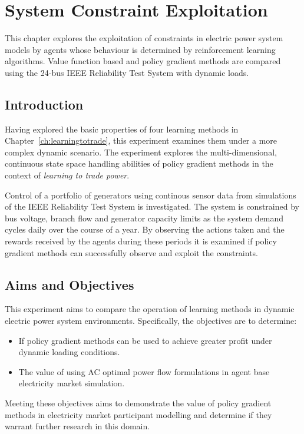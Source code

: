 \chapter{System Constraint Exploitation}
\label{ch:exploitation}
This chapter explores the exploitation of constraints in electric power
system models by agents whose behaviour is determined by reinforcement learning
algorithms.  Value function based and policy gradient methods are compared
using the 24-bus IEEE Reliability Test System with dynamic loads.

\section{Introduction}
Having explored the basic properties of four learning methods in
Chapter~\ref{ch:learningtotrade}, this experiment examines them under a
more complex dynamic scenario.  The experiment explores the multi-dimensional,
continuous state space handling abilities of policy gradient methods in the
context of \textit{learning to trade power}.

Control of a portfolio of generators using continous sensor data from
simulations of the IEEE Reliability Test System \cite{ieee79rts} is
investigated.  The system is constrained by bus voltage, branch flow and generator capacity
limits as the system demand cycles daily over the course of a year. By
observing the actions taken and the rewards received by the agents during these
periods it is examined if policy gradient methods can successfully observe and
exploit the constraints.

\section{Aims and Objectives}
This experiment aims to compare the operation of learning methods in dynamic
electric power system environments.  Specifically, the objectives are to
determine:
\begin{itemize}
  \item If policy gradient methods can be used to achieve greater profit under
  dynamic loading conditions.
  \item The value of using AC optimal power flow formulations in agent base
  electricity market simulation.
\end{itemize}
Meeting these objectives aims to demonstrate the value of policy gradient
methods in electricity market participant modelling and determine if they
warrant further research in this domain.

